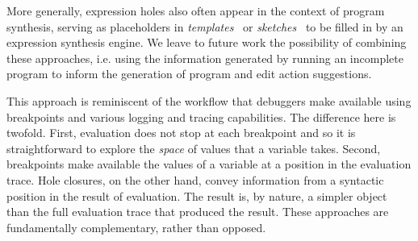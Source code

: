 More generally, expression holes also often appear in the context of program synthesis, serving as
placeholders in \emph{templates}~\cite{srivastava2013template} or
\emph{sketches}~\cite{solar2009sketching} to be filled in by an expression
synthesis engine. We leave to future work the possibility of combining these approaches, i.e. using the information generated by running an incomplete program to inform the generation of program and edit action suggestions.

This approach is reminiscent of the workflow that debuggers make available using breakpoints \cite{fitzgerald2008debugging,DBLP:journals/jfp/TolmachA95} and various logging and tracing capabilities. 
The difference here is twofold. First, evaluation does not stop at each breakpoint and so it is straightforward to explore the \emph{space} of values that a variable takes. Second, breakpoints make available the values of a variable at a position in the evaluation trace. Hole closures, on the other hand, convey information from a syntactic position in the result of evaluation. The result is, by nature, a simpler object than the full evaluation trace that produced the result. These approaches are fundamentally complementary, rather than opposed.


